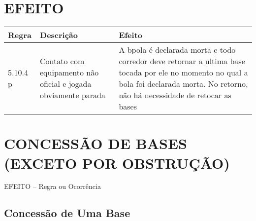 \section*{EFEITO}

{\footnotesize\begin{tabular}{p{15mm}p{80mm}p{70mm}}
		Regra& Descrição & Efeito\\\hline
		5.10.4 p& Contato com equipamento não oficial e jogada obviamente parada&

		A bpola é declarada morta e todo corredor deve retornar a ultima base tocada por ele no momento no qual a bola foi declarada morta. No retorno, não há necessidade de retocar as bases
\end{tabular}}

\section{CONCESSÃO DE BASES (EXCETO POR OBSTRUÇÃO)}

EFEITO -- Regra ou Ocorrência

\subsection{Concessão de Uma Base}

